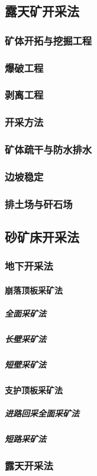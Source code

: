 \documentclass[UTF8]{../../ApplicationUniverse}
\begin{document}
    \subsection{露天矿开采法}
        \subsubsection{矿体开拓与挖掘工程}
        \subsubsection{爆破工程}
        \subsubsection{剥离工程}
        \subsubsection{开采方法}
        \subsubsection{矿体疏干与防水排水}
        \subsubsection{边坡稳定}
        \subsubsection{排土场与矸石场}
    \subsection{砂矿床开采法}
        \subsubsection{地下开采法}
            \paragraph{崩落顶板采矿法}
                \subparagraph{全面采矿法}
                \subparagraph{长壁采矿法}
                \subparagraph{短壁采矿法}
            \paragraph{支护顶板采矿法}
                \subparagraph{进路回采全面采矿法}
                \subparagraph{短路采矿法}
        \subsubsection{露天开采法}
\end{document}
